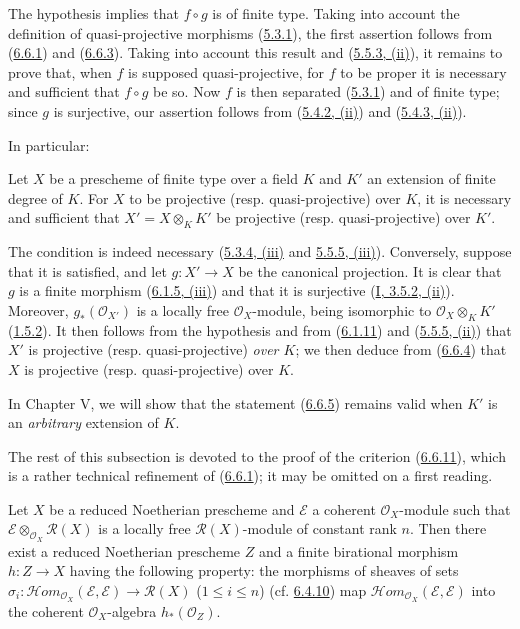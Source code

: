 The hypothesis implies that $f\circ g$ is of finite type. Taking into account
the definition of quasi-projective morphisms
(\hyperref[II.5.3.1]{5.3.1}), the first assertion follows from
(\hyperref[II.6.6.1]{6.6.1}) and
(\hyperref[II.6.6.3]{6.6.3}). Taking into account this result and
(\hyperref[II.5.5.3]{5.5.3, (ii)}), it remains to prove that, when $f$ is
supposed quasi-projective, for $f$ to be proper it is necessary and
sufficient that $f\circ g$ be so. Now $f$ is then separated
(\hyperref[II.5.3.1]{5.3.1}) and of finite type; since $g$ is surjective,
our assertion follows from (\hyperref[II.5.4.2]{5.4.2, (ii)}) and
(\hyperref[II.5.4.3]{5.4.3, (ii)}).

In particular:

\begin{corollary}[6.6.5]
\label{II.6.6.5}
Let $X$ be a prescheme of finite type over a field $K$ and $K'$ an extension
of finite degree of $K$. For $X$ to be projective (resp. quasi-projective)
over $K$, it is necessary and sufficient that $X'=X\otimes_K K'$ be
projective (resp. quasi-projective) over $K'$.
\end{corollary}

The condition is indeed necessary
(\hyperref[II.5.3.4]{5.3.4, (iii)} and
\hyperref[II.5.5.5]{5.5.5, (iii)}). Conversely, suppose that it is
satisfied, and let $g:X'\to X$ be the canonical projection. It is clear that
$g$ is a finite morphism (\hyperref[II.6.1.5]{6.1.5, (iii)}) and that it is
surjective (\hyperref[I.3.5.2]{I, 3.5.2, (ii)}). Moreover,
$g_*(\mathcal{O}_{X'})$ is a locally free $\mathcal{O}_X$-module, being
isomorphic to $\mathcal{O}_X\otimes_K K'$
(\hyperref[II.1.5.2]{1.5.2}). It then follows from the hypothesis and from
(\hyperref[II.6.1.11]{6.1.11}) and
(\hyperref[II.5.5.5]{5.5.5, (ii)}) that $X'$ is projective (resp.
quasi-projective) \emph{over $K$}; we then deduce from
(\hyperref[II.6.6.4]{6.6.4}) that $X$ is projective (resp.
quasi-projective) over $K$.

In Chapter V, we will show that the statement
(\hyperref[II.6.6.5]{6.6.5}) remains valid when $K'$ is an
\emph{arbitrary} extension of $K$.

The rest of this subsection is devoted to the proof of the criterion
(\hyperref[II.6.6.11]{6.6.11}), which is a rather technical refinement of
(\hyperref[II.6.6.1]{6.6.1}); it may be omitted on a first reading.

\begin{lemma}[6.6.6]
\label{II.6.6.6}
Let $X$ be a reduced Noetherian prescheme and $\mathcal{E}$ a coherent
$\mathcal{O}_X$-module such that
$\mathcal{E}\otimes_{\mathcal{O}_X}\mathcal{R}(X)$ is a locally free
$\mathcal{R}(X)$-module of constant rank $n$. Then there exist
a reduced Noetherian prescheme $Z$ and a finite birational morphism
$h:Z\to X$ having the following property: the morphisms of sheaves
of sets
$\sigma_i:\mathcal{H}om_{\mathcal{O}_X}(\mathcal{E},\mathcal{E})
\to\mathcal{R}(X)$ ($1\leq i\leq n$)
(cf. \hyperref[II.6.4.10]{6.4.10}) map
$\mathcal{H}om_{\mathcal{O}_X}(\mathcal{E},\mathcal{E})$ into the
coherent $\mathcal{O}_X$-algebra $h_*(\mathcal{O}_Z)$.
\end{lemma}

